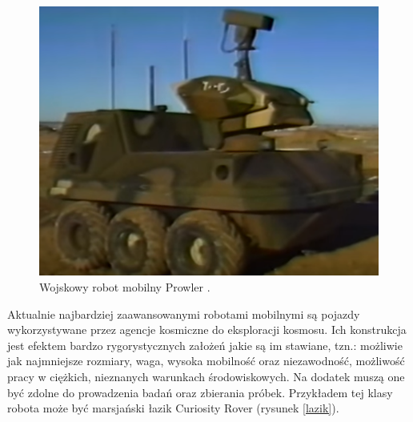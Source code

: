  \begin{figure}[H]
    \begin{center}
      \includegraphics[scale=0.4]{imgs/state.png}
 \caption[Pojaz wojskowy \textit{Prowler}]{\small{Wojskowy robot mobilny Prowler .}\footnotemark}
        \label{state}
    \end{center}
  \end{figure}

Aktualnie najbardziej zaawansowanymi robotami mobilnymi są pojazdy wykorzystywane przez agencje kosmiczne do eksploracji kosmosu. Ich konstrukcja jest efektem bardzo rygorystycznych założeń jakie są im stawiane, tzn.: możliwie jak najmniejsze rozmiary, waga, wysoka mobilność oraz niezawodność, możliwość pracy w ciężkich, nieznanych warunkach środowiskowych. Na dodatek muszą one być zdolne do prowadzenia badań oraz zbierania próbek. Przykładem tej klasy robota może być marsjański łazik Curiosity Rover (rysunek \ref{lazik}).

